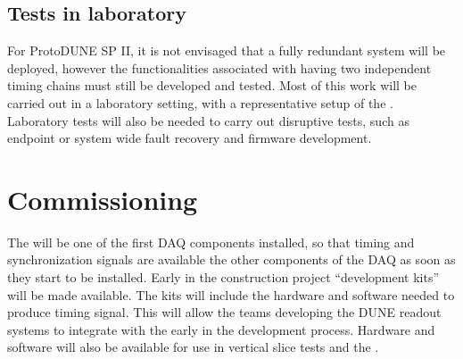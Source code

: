 \documentclass{article}
\begin{document}
\subsection{Tests in laboratory}
For ProtoDUNE SP II, it is not envisaged that a fully redundant system will be deployed, however the functionalities associated with having two independent timing chains must still be developed and tested. Most of this work will be carried out in a laboratory setting, with a representative setup of the . Laboratory tests will also be needed to carry out disruptive tests, such as endpoint or system wide fault recovery and firmware development.

\section{Commissioning}
The  will be one of the first DAQ components installed, so that timing and synchronization signals are available the other components of the DAQ as soon as they start to be installed. Early in the construction project  ``development kits'' will be made available. The kits will include the hardware and software needed to produce  timing signal. This will allow the teams developing the DUNE readout systems to integrate with the  early in the development process. Hardware and software will also be available for use in vertical slice tests and the . 

\printglossary
\printbibliography
\end{document}
